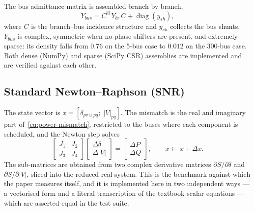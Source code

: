 \documentclass[sigconf,nonacm]{acmart}
\begin{document}
The bus admittance matrix is assembled branch by branch,
\begin{equation}
Y_{bus} = C^{\mathsf H} \, Y_{br} \, C + \operatorname{diag}(y_{sh}),
\end{equation}
where $C$ is the branch--bus incidence structure and $y_{sh}$ collects the bus
shunts. $Y_{bus}$ is complex, symmetric when no phase shifters are present, and
extremely sparse: its density falls from $0.76$ on the 5-bus case to $0.012$ on
the 300-bus case. Both dense (NumPy) and sparse (SciPy CSR) assemblies are
implemented and are verified against each other.

\subsection{Standard Newton--Raphson (SNR)}
The state vector is $x = [\delta_{pv \cup pq};\; |V|_{pq}]$. The mismatch is the
real and imaginary part of~\eqref{eq:power-mismatch}, restricted to the buses
where each component is scheduled, and the Newton step solves
\begin{equation}
\begin{bmatrix} J_1 & J_2 \\ J_3 & J_4 \end{bmatrix}
\begin{bmatrix} \Delta\delta \\ \Delta|V| \end{bmatrix}
=
\begin{bmatrix} \Delta P \\ \Delta Q \end{bmatrix},
\qquad x \leftarrow x + \Delta x .
\end{equation}
The sub-matrices are obtained from two complex derivative matrices
$\partial S/\partial\delta$ and $\partial S/\partial |V|$, sliced into the
reduced real system. This is the benchmark against which the paper measures
itself, and it is implemented here in two independent ways --- a vectorised
form and a literal transcription of the textbook scalar equations --- which are
asserted equal in the test suite.
\end{document}
